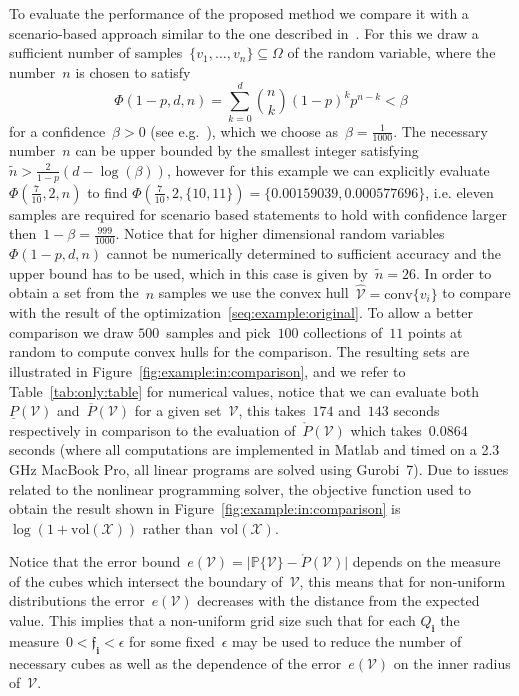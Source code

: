 \documentclass[letterpaper, 10pt, conference]{ieeeconf} %
\providecommand{\conv}{\text{conv}}
\providecommand{\bfa}[1]{\mathbf{#1}}
\begin{document}
%
To evaluate the performance of the proposed method we compare it with a scenario-based approach similar to the one described in~\cite{Margellos:2014}.
%
For this we draw a sufficient number of samples~$\{v_1,\dots,v_n\}\subseteq\Omega$ of the random variable, where the number~$n$ is chosen to satisfy
\[
\Phi(1-p,d,n) = \sum_{k=0}^{d}\binom{n}{k}(1-p)^kp^{n-k}<\beta
\]
for a confidence~$\beta>0$ (see e.g.~\cite{Calafiore:2010}), which we choose as~$\beta=\frac{1}{1000}$.
%
The necessary number~$n$ can be upper bounded by the smallest integer satisfying~$\tilde n>\frac{2}{1-p}(d-\log(\beta))$, however for this example we can explicitly evaluate~$\Phi(\frac{7}{10},2,n)$ to find $\Phi(\frac{7}{10},2,\{10,11\}) = \{0.00159039,0.000577696\}$, i.e. eleven samples are required for scenario based statements to hold with confidence larger then~$1-\beta=\frac{999}{1000}$.
%
Notice that for higher dimensional random variables~$\Phi(1-p,d,n)$ cannot be numerically determined to sufficient accuracy and the upper bound has to be used, which in this case is given by~$\tilde n=26$.
%
In order to obtain a set from the~$n$ samples we use the convex hull~$\hat{\mathcal V}=\conv\{v_i\}$ to compare with the result of the optimization~\eqref{seq:example:original}.
%
To allow a better comparison we draw $500$~samples and pick~$100$ collections of~$11$ points at random to compute convex hulls for the comparison.
%
The resulting sets are illustrated in Figure~\ref{fig:example:in:comparison}, and we refer to Table~\ref{tab:only:table} for numerical values, notice that we can evaluate both~$\underline{P}(\mathcal V)$ and~$\overline{P}(\mathcal V)$ for a given set~$\mathcal V$, this takes~$174$ and~$143$ seconds respectively in comparison to the evaluation of~$\mathring{P}(\mathcal V)$ which takes~$0.0864$ seconds (where all computations are implemented in Matlab and timed on a 2.3 GHz MacBook Pro, all linear programs are solved using Gurobi~7).
%
Due to issues related to the nonlinear programming solver, the objective function used to obtain the result shown in Figure~\ref{fig:example:in:comparison} is~$\log(1+\text{vol}(\mathcal X))$ rather than~$\text{vol}(\mathcal X)$.
%


%
Notice that the error bound~$e(\mathcal V) = \lvert\mathbb P\{\mathcal V\}-\mathring{P}(\mathcal V)\rvert$ depends on the measure of the cubes which intersect the boundary of~$\mathcal V$, this means that for non-uniform distributions the error~$e(\mathcal V)$ decreases with the distance from the expected value.
%
This implies that a non-uniform grid size such that for each $Q_\bfa{i}$ the measure~$0<\mathfrak{f}_\bfa{i}<\epsilon$ for some fixed~$\epsilon$ may be used to reduce the number of necessary cubes as well as the dependence of the error~$e(\mathcal V)$ on the inner radius of~$\mathcal V$.
\end{document}
